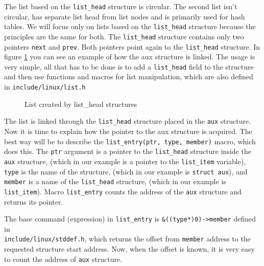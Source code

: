 The list based on the \texttt{list\_head} structure is circular. The second list isn't circular,
has separate list head from list nodes and is primarily used for hash tables. 
We will focus only on lists based on the \texttt{list\_head} structure because the
principles are the same for both. The \texttt{list\_head} structure contains only two
pointers \texttt{next} and \texttt{prev}. Both pointers point again to the
\texttt{list\_head} structure. In figure \ref{fig:vfs_list} you can see an example of how
the aux structure is linked. The usage is very simple, all that has to be done is to
add a \texttt{list\_head} field to the structure and then use functions and macros for
list manipulation, which are also defined in \texttt{include/linux/list.h}

\begin{figure}[h]
	\begin{center}
		
	\end{center}
	\caption{List created by list\_head structures}
	\label{fig:vfs_list}
\end{figure}

The list is linked through the \texttt{list\_head} structure placed in the \texttt{aux}
structure. Now it is time to explain how the pointer to the aux structure is acquired.
The best way will be to describe the \texttt{list\_entry(ptr, type, member)} macro, which
does this. The \texttt{ptr} argument is a pointer to the \texttt{list\_head}
structure inside the \texttt{aux} structure, (which in our example is a pointer to the
\texttt{list\_item} variable), \texttt{type} is the name of the structure, (which in our example
is \texttt{struct aux}), and \texttt{member} is a name of the \texttt{list\_head}
structure, (which in our example is \texttt{list\_item}). Macro \texttt{list\_entry}
counts the address of the \texttt{aux} structure and returns its pointer. 

The base command (expression) in \texttt{list\_entry} is \texttt{\&((type*)0)->member}
defined in \\ \texttt{include/linux/stddef.h}, which returns the offset from
\texttt{member} address to the requested structure start address. Now, when the offset
is known, it is very easy to count the address of \texttt{aux} structure.

 
